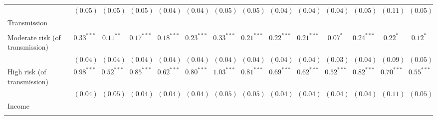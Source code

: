 \begin{sidewaystable}
\begin{center}
\begin{scriptsize}
\begin{tabular}{l c c c c c c c c c c c c c}
                                                & $(0.05)$      & $(0.05)$      & $(0.05)$      & $(0.04)$      & $(0.04)$      & $(0.05)$      & $(0.05)$      & $(0.04)$      & $(0.04)$      & $(0.04)$      & $(0.05)$      & $(0.11)$      & $(0.05)$      \\
Transmission                                    &               &               &               &               &               &               &               &               &               &               &               &               &               \\
                                                &               &               &               &               &               &               &               &               &               &               &               &               &               \\
\quad Moderate risk (of transmission)           & $0.33^{***}$  & $0.11^{**}$   & $0.17^{***}$  & $0.18^{***}$  & $0.23^{***}$  & $0.33^{***}$  & $0.21^{***}$  & $0.22^{***}$  & $0.21^{***}$  & $0.07^{*}$    & $0.24^{***}$  & $0.22^{*}$    & $0.12^{*}$    \\
                                                & $(0.04)$      & $(0.04)$      & $(0.04)$      & $(0.04)$      & $(0.04)$      & $(0.04)$      & $(0.04)$      & $(0.04)$      & $(0.04)$      & $(0.03)$      & $(0.04)$      & $(0.09)$      & $(0.05)$      \\
\quad High risk (of transmission)               & $0.98^{***}$  & $0.52^{***}$  & $0.85^{***}$  & $0.62^{***}$  & $0.80^{***}$  & $1.03^{***}$  & $0.81^{***}$  & $0.69^{***}$  & $0.62^{***}$  & $0.52^{***}$  & $0.82^{***}$  & $0.70^{***}$  & $0.55^{***}$  \\
                                                & $(0.04)$      & $(0.05)$      & $(0.04)$      & $(0.04)$      & $(0.04)$      & $(0.05)$      & $(0.05)$      & $(0.04)$      & $(0.04)$      & $(0.04)$      & $(0.04)$      & $(0.11)$      & $(0.05)$      \\
Income                                          &               &               &               &               &               &               &               &               &               &               &               &               &               \\
                                                &               &               &               &               &               &               &               &               &               &               &               &               &               \\

\end{tabular}
\end{scriptsize}
\end{center}
\end{sidewaystable}
